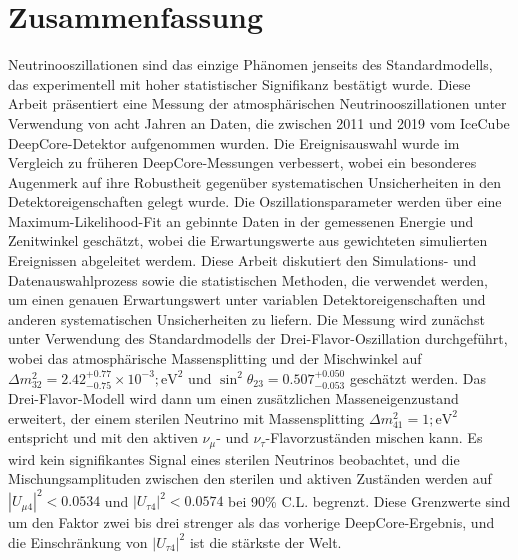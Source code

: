 \chapter{Zusammenfassung}

Neutrinooszillationen sind das einzige Phänomen jenseits des Standardmodells, das experimentell mit hoher statistischer Signifikanz bestätigt wurde.
Diese Arbeit präsentiert eine Messung der atmosphärischen Neutrinooszillationen unter Verwendung von acht Jahren an Daten, die zwischen 2011 und 2019 vom IceCube DeepCore-Detektor aufgenommen wurden.
Die Ereignisauswahl wurde im Vergleich zu früheren DeepCore-Messungen verbessert, wobei ein besonderes Augenmerk auf ihre Robustheit gegenüber systematischen Unsicherheiten in den Detektoreigenschaften gelegt wurde.
Die Oszillationsparameter werden über eine Maximum-Likelihood-Fit an gebinnte Daten in der gemessenen Energie und Zenitwinkel geschätzt, wobei die Erwartungswerte aus gewichteten simulierten Ereignissen abgeleitet werdem.
Diese Arbeit diskutiert den Simulations- und Datenauswahlprozess sowie die statistischen Methoden, die verwendet werden, um einen genauen Erwartungswert unter variablen Detektoreigenschaften und anderen systematischen Unsicherheiten zu liefern.
Die Messung wird zunächst unter Verwendung des Standardmodells der Drei-Flavor-Oszillation durchgeführt, wobei das atmosphärische Massensplitting und der Mischwinkel auf $\Delta m^2_{32} = 2.42_{-0.75}^{+0.77} \times10^{-3};\mathrm{eV}^2$ und $\sin^2\theta_{23} = 0.507_{-0.053}^{+0.050}$ geschätzt werden.
Das Drei-Flavor-Modell wird dann um einen zusätzlichen Masseneigenzustand erweitert, der einem sterilen Neutrino mit Massensplitting $\Delta m^2_{41} = 1;\mathrm{eV}^2$ entspricht und mit den aktiven $\nu_\mu$- und $\nu_\tau$-Flavorzuständen mischen kann.
Es wird kein signifikantes Signal eines sterilen Neutrinos beobachtet, und die Mischungsamplituden zwischen den sterilen und aktiven Zuständen werden auf $|U_{\mu 4}|^2 < 0.0534$ und $|U_{\tau 4}|^2 < 0.0574$ bei 90\% C.L.
begrenzt.
Diese Grenzwerte sind um den Faktor zwei bis drei strenger als das vorherige DeepCore-Ergebnis, und die Einschränkung von $|U_{\tau 4}|^2$ ist die stärkste der Welt.
